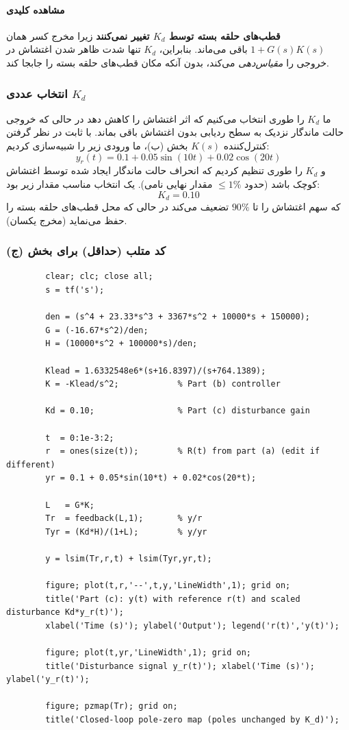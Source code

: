 \documentclass[a4paper]{article}
\begin{document}
\paragraph{مشاهده کلیدی}
\textbf{قطب‌های حلقه بسته توسط $K_d$ تغییر نمی‌کنند} زیرا مخرج کسر همان $1+G(s)K(s)$ باقی می‌ماند. بنابراین، $K_d$ تنها شدت ظاهر شدن اغتشاش در خروجی را \emph{مقیاس‌دهی} می‌کند، بدون آنکه مکان قطب‌های حلقه بسته را جابجا کند.

\subsubsection*{انتخاب عددی $K_d$}
ما $K_d$ را طوری انتخاب می‌کنیم که اثر اغتشاش را کاهش دهد در حالی که خروجی حالت ماندگار نزدیک به سطح ردیابی بدون اغتشاش باقی بماند.
با ثابت در نظر گرفتن کنترل‌کننده $K(s)$ بخش (ب)، ما ورودی زیر را شبیه‌سازی کردیم:
\[
y_r(t)=0.1+0.05\sin(10t)+0.02\cos(20t)
\]
و $K_d$ را طوری تنظیم کردیم که انحراف حالت ماندگار ایجاد شده توسط اغتشاش کوچک باشد (حدود $\le 1\%$ مقدار نهایی نامی). یک انتخاب مناسب مقدار زیر بود:
\begin{equation}
	\boxed{K_d = 0.10}
\end{equation}
که سهم اغتشاش را تا $90\%$ تضعیف می‌کند در حالی که محل قطب‌های حلقه بسته را حفظ می‌نماید (مخرج یکسان).

\subsubsection*{کد متلب (حداقل) برای بخش (ج)}
\begin{latin}
	\begin{verbatim}
		clear; clc; close all;
		s = tf('s');
		
		den = (s^4 + 23.33*s^3 + 3367*s^2 + 10000*s + 150000);
		G = (-16.67*s^2)/den;
		H = (10000*s^2 + 100000*s)/den;
		
		Klead = 1.6332548e6*(s+16.8397)/(s+764.1389);
		K = -Klead/s^2;            % Part (b) controller
		
		Kd = 0.10;                 % Part (c) disturbance gain
		
		t  = 0:1e-3:2;
		r  = ones(size(t));        % R(t) from part (a) (edit if different)
		yr = 0.1 + 0.05*sin(10*t) + 0.02*cos(20*t);
		
		L   = G*K;
		Tr  = feedback(L,1);       % y/r
		Tyr = (Kd*H)/(1+L);        % y/yr
		
		y = lsim(Tr,r,t) + lsim(Tyr,yr,t);
		
		figure; plot(t,r,'--',t,y,'LineWidth',1); grid on;
		title('Part (c): y(t) with reference r(t) and scaled disturbance Kd*y_r(t)');
		xlabel('Time (s)'); ylabel('Output'); legend('r(t)','y(t)');
		
		figure; plot(t,yr,'LineWidth',1); grid on;
		title('Disturbance signal y_r(t)'); xlabel('Time (s)'); ylabel('y_r(t)');
		
		figure; pzmap(Tr); grid on;
		title('Closed-loop pole-zero map (poles unchanged by K_d)');
	\end{verbatim}
\end{latin}
\end{document}
